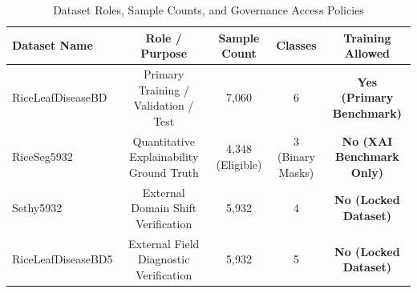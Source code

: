\begin{table}[t]
\centering
\caption{Dataset Roles, Sample Counts, and Governance Access Policies}
\label{tab:dataset_summary}
\small
\setlength{\tabcolsep}{14pt}
\begin{tabular}{lcccc}
\toprule
\textbf{Dataset Name} & \textbf{Role / Purpose} & \textbf{Sample Count} & \textbf{Classes} & \textbf{Training Allowed} \\
\midrule
RiceLeafDiseaseBD & Primary Training / Validation / Test & 7,060 & 6 & \textbf{Yes (Primary Benchmark)} \\
RiceSeg5932 & Quantitative Explainability Ground Truth & 4,348 (Eligible) & 3 (Binary Masks) & \textbf{No (XAI Benchmark Only)} \\
Sethy5932 & External Domain Shift Verification & 5,932 & 4 & \textbf{No (Locked Dataset)} \\
RiceLeafDiseaseBD5 & External Field Diagnostic Verification & 5,932 & 5 & \textbf{No (Locked Dataset)} \\
\bottomrule
\end{tabular}
\end{table}


